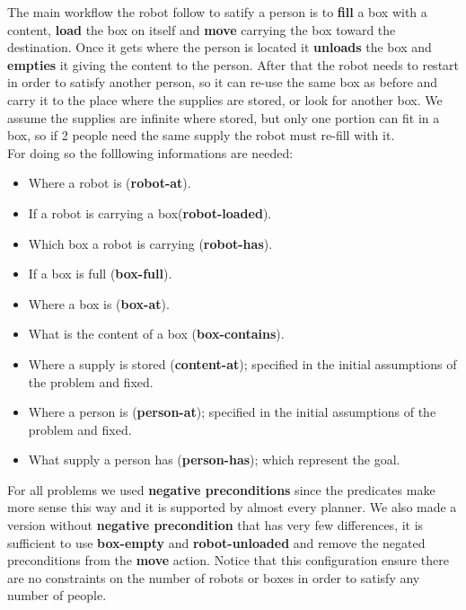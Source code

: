 The main workflow the robot follow to satify a person is to \textbf{fill} a box with a content,
\textbf{load} the box on itself and \textbf{move} carrying the box toward the destination.
Once it gets where the person is located it \textbf{unloads} the box and \textbf{empties} it giving the content to the person.
After that the robot needs to restart in order to satisfy another person, so it can re-use the same box as before and carry it to the place where the supplies are stored, or look for another box.
We assume the supplies are infinite where stored, but only one portion can fit in a box, so if 2 people need the same supply the robot must re-fill with it.
\\
For doing so the folllowing informations are needed:
\begin{itemize}
    \item Where a robot is (\textbf{robot-at}).
    \item If a robot is carrying a box(\textbf{robot-loaded}).
    \item Which box a robot is carrying (\textbf{robot-has}).
    \item If a box is full (\textbf{box-full}).
    \item Where a box is (\textbf{box-at}).
    \item What is the content of a box (\textbf{box-contains}).
    \item Where a supply is stored (\textbf{content-at}); specified in the initial assumptions of the problem and fixed.
    \item Where a person is (\textbf{person-at}); specified in the initial assumptions of the problem and fixed.
    \item What supply a person has (\textbf{person-has}); which represent the goal.
\end{itemize}
For all problems we used \textbf{negative preconditions} since the predicates make more sense this way and it is supported by almost every planner.
We also made a version without \textbf{negative precondition} that has very few differences, it is sufficient to use \textbf{box-empty} and \textbf{robot-unloaded} and remove the negated preconditions from the \textbf{move} action. 
Notice that this configuration ensure there are no constraints on the number of robots or boxes in order to satisfy any number of people.